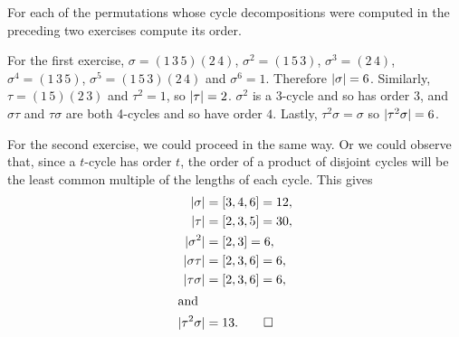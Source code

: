  For each of the permutations whose cycle decompositions
were computed in the preceding two exercises compute its order.
\begin{solution}
  For the first exercise, $\sigma = (1\,3\,5)(2\,4)$,
  $\sigma^2 = (1\,5\,3)$, $\sigma^3 = (2\,4)$, $\sigma^4 = (1\,3\,5)$,
  $\sigma^5 = (1\,5\,3)(2\,4)$ and $\sigma^6 = 1$. Therefore
  $\lvert{\sigma}\rvert = 6$. Similarly, $\tau = (1\,5)(2\,3)$ and
  $\tau^2 = 1$, so $\lvert{\tau}\rvert = 2$. $\sigma^2$ is a 3-cycle and so
  has order $3$, and $\sigma\tau$ and $\tau\sigma$ are both 4-cycles
  and so have order $4$. Lastly, $\tau^2\sigma = \sigma$ so
  $\lvert{\tau^2\sigma}\rvert = 6$.

  For the second exercise, we could proceed in the same way. Or we
  could observe that, since a $t$-cycle has order $t$, the order of a
  product of disjoint cycles will be the least common multiple of the
  lengths of each cycle. This gives
  \begin{align*}
    \lvert{\sigma}\rvert &= [3,4,6] = 12, \\
    \lvert{\tau}\rvert &= [2,3,5] = 30, \\
    \lvert{\sigma^2}\rvert &= [2,3] = 6, \\
    \lvert{\sigma\tau}\rvert &= [2,3,6] = 6, \\
    \lvert{\tau\sigma}\rvert &= [2,3,6] = 6, \\
    \intertext{and}
    \lvert{\tau^2\sigma}\rvert &= 13. \qedhere
  \end{align*}
\end{solution}
